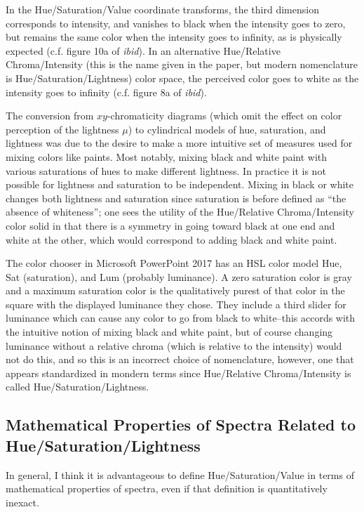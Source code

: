 \documentclass{article}
\begin{document}
In the Hue/Saturation/Value coordinate transforms, the third dimension
corresponds to intensity, and vanishes to black when the intensity goes to
zero, but remains the same color when the intensity goes to infinity, as is
physically expected (c.f. figure 10a of \emph{ibid}). In an alternative
Hue/Relative Chroma/Intensity (this is the name given in the paper, but modern
nomenclature is Hue/Saturation/Lightness) color space, the perceived color goes
to white as the intensity goes to infinity (c.f. figure 8a of \emph{ibid}).

The conversion from $xy$-chromaticity diagrams (which omit the effect on color
perception of the lightness $\mu$) to cylindrical models of hue, saturation,
and lightness was due to the desire to make a more intuitive set of measures
used for mixing colors like paints. Most notably, mixing black and white paint
with various saturations of hues to make different lightness. In practice it is
not possible for lightness and saturation to be independent. Mixing in black or
white changes both lightness and saturation since saturation is before defined
as \enquote{the absence of whiteness}; one sees the utility of the Hue/Relative
Chroma/Intensity color solid in that there is a symmetry in going toward black
at one end and white at the other, which would correspond to adding black and
white paint.

The color chooser in Microsoft PowerPoint 2017 has an HSL color model Hue, Sat
(saturation), and Lum (probably luminance). A zero saturation color is gray and
a maximum saturation color is the qualitatively purest of that color in the
square with the displayed luminance they chose.  They include a third slider
for luminance which can cause any color to go from black to white--this accords
with the intuitive notion of mixing black and white paint, but of course
changing luminance without a relative chroma (which is relative to the
intensity) would not do this, and so this is an incorrect choice of
nomenclature, however, one that appears standardized in mondern terms since
Hue/Relative Chroma/Intensity is called Hue/Saturation/Lightness.

\subsection{Mathematical Properties of Spectra Related to Hue/Saturation/Lightness}

In general, I think it is advantageous to define Hue/Saturation/Value in
terms of mathematical properties of spectra, even if that definition is
quantitatively inexact. 
\end{document}
